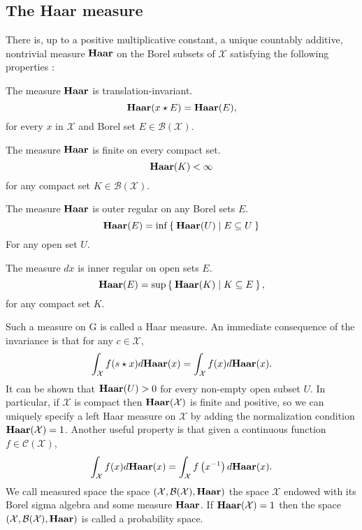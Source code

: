 \subsection{The Haar measure}
\begin{definition}
There is, up to a positive multiplicative constant, a unique countably additive, nontrivial measure $\mathbf{Haar}$ on the Borel subsets of $\mathcal{X}$ satisfying the following properties :
\begin{propenum}
\item The measure $\mathbf{Haar}$ is translation-invariant.
\begin{dmath*}
\Haar(x\groupop E) = \Haar(E),
\end{dmath*}
for every $x$ in $\mathcal{X}$ and Borel set $E\in\mathcal{B}(\mathcal{X})$.
\item The measure $\mathbf{Haar}$ is finite on every compact set.
\begin{dmath*}
\Haar(K) < \infty
\end{dmath*}
for any compact set $K\in\mathcal{B}(\mathcal{X})$.
\item The measure $\mathbf{Haar}$ is outer regular on any Borel sets $E$.
\begin{dmath*}
\Haar(E)=\inf \Set{\Haar(U) | E\subseteq U}
\end{dmath*}
For any open set $U$.
\item The measure $dx$ is inner regular on open sets $E$.
\begin{dmath*}
\Haar(E)=\sup\Set{\Haar(K) | K\subseteq E},
\end{dmath*}
for any compact set $K$.
\end{propenum}
\end{definition}
Such a measure on G is called a Haar measure. An immediate consequence of the invariance is that for any $c\in\mathcal{X}$,
\begin{dmath*}
\int_{\mathcal{X}}f(s\groupop x)d\Haar(x)=\int_{\mathcal{X}}f(x)d\Haar(x).
\end{dmath*}
It can be shown that $\mathbf{Haar}(U) > 0$ for every non-empty open subset $U$. In particular, if $\mathcal{X}$ is compact then $\mathbf{Haar}(\mathcal{X})$ is finite and positive, so we can uniquely specify a left Haar measure on $\mathcal{X}$ by adding the normalization condition $\mathbf{Haar}(\mathcal{X})=1$. Another useful property is that given a continuous function $f\in\mathcal{C}(\mathcal{X})$,
\begin{dmath*}
\int_{\mathcal{X}}f(x)d\Haar(x)=\int_{\mathcal{X}}f\left(\inv{x}\right)d\Haar(x).
\end{dmath*}
We call measured space the space $(\mathcal{X},\mathcal{B}(\mathcal{X}),\mathbf{Haar})$ the space $\mathcal{X}$ endowed with its Borel sigma algebra and some measure $\mathbf{Haar}$. If $\mathbf{Haar}(\mathcal{X})=1$ then the space $(\mathcal{X},\mathcal{B}(\mathcal{X}),\mathbf{Haar})$ is called a probability space.
